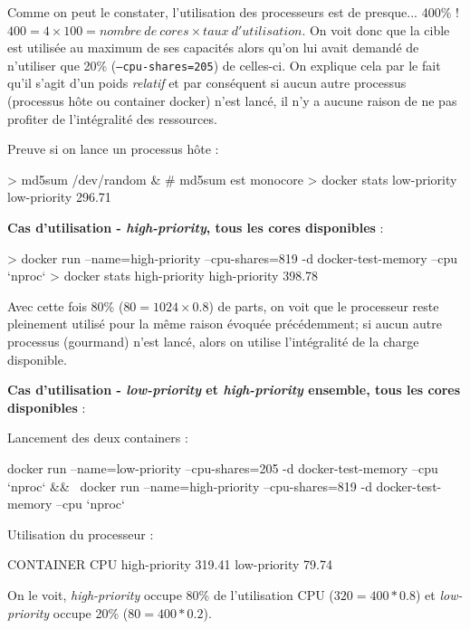 \documentclass[11pt,a4paper,oneside]{report}
\newcommand{\code}[1]{\texttt{#1}}
\begin{document}
Comme on peut le constater, l'utilisation des processeurs est de presque... 400\% ! $400 = 4 \times 100  = nombre\ de\ cores \times taux\ d'utilisation$. On voit donc que la cible est utilisée au maximum de ses capacités alors qu'on lui avait demandé de n'utiliser que 20\% (\code{--cpu-shares=205}) de celles-ci. On explique cela par le fait qu'il s'agit d'un poids \textit{relatif} et par conséquent si aucun autre processus (processus hôte ou container docker) n'est lancé, il n'y a aucune raison de ne pas profiter de l'intégralité des ressources.

Preuve si on lance un processus hôte : 
\begin{bashcode}
> md5sum /dev/random & # md5sum est monocore
> docker stats low-priority
low-priority   296.71%
\end{bashcode}

\textbf{Cas d'utilisation - \textit{high-priority}, tous les cores disponibles} :
\begin{bashcode}
> docker run --name=high-priority --cpu-shares=819 -d docker-test-memory --cpu `nproc`
> docker stats high-priority
high-priority   398.78%
\end{bashcode}

Avec cette fois 80\% ($80 = 1024 \times 0.8$) de parts, on voit que le processeur reste pleinement utilisé pour la même raison évoquée précédemment; si aucun autre processus (gourmand) n’est lancé, alors on utilise l'intégralité de la charge disponible.


\textbf{Cas d'utilisation - \textit{low-priority} et \textit{high-priority} ensemble, tous les cores disponibles} :

Lancement des deux containers :
\begin{bashcode}
docker run --name=low-priority  --cpu-shares=205 -d docker-test-memory --cpu `nproc` && \
docker run --name=high-priority --cpu-shares=819 -d docker-test-memory --cpu `nproc`
\end{bashcode}

Utilisation du processeur :
\begin{textcode}
CONTAINER      CPU %
high-priority  319.41%
low-priority   79.74%
\end{textcode}

On le voit, \textit{high-priority} occupe 80\% de l'utilisation CPU ($320 = 400 * 0.8$) et \textit{low-priority} occupe 20\% ($80 = 400 * 0.2$).
\end{document}

